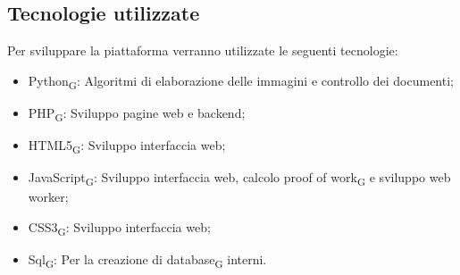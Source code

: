 \subsection{Tecnologie utilizzate}
Per sviluppare la piattaforma verranno utilizzate le seguenti tecnologie:
\begin{itemize}
    \item Python\textsubscript{G}: Algoritmi di elaborazione delle immagini e controllo dei documenti;
    \item PHP\textsubscript{G}: Sviluppo pagine web e backend;
    \item HTML5\textsubscript{G}: Sviluppo interfaccia web;
    \item JavaScript\textsubscript{G}: Sviluppo interfaccia web, calcolo proof of work\textsubscript{G} e sviluppo web worker;
    \item CSS3\textsubscript{G}: Sviluppo interfaccia web;
    \item Sql\textsubscript{G}: Per la creazione di database\textsubscript{G} interni.
\end{itemize}


